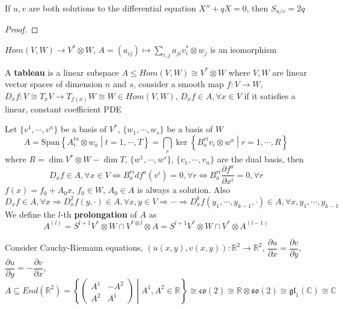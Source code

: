 \documentclass[../main.tex]{subfiles}
\begin{document}
\begin{lemma}
If $u,v$ are both solutions to the differential equation $X''+qX=0$, then $S_{u/v}=2q$
\end{lemma}

\begin{proof}

\end{proof}

\begin{lemma}
$Hom(V,W)\to V^*\otimes W$, $A=(a_{ij})\mapsto\sum_{i,j}a_{ji}v^*_i\otimes w_j$ is an isomorphism
\end{lemma}

\begin{definition}
A \textbf{tableau} is a linear subspace $A\leq Hom(V,W)\cong V^*\otimes W$ where $V,W$ are linear vector spaces of dimension $n$ and $s$, consider a smooth map $f:V\to W$, $D_xf:V\cong T_xV\to T_{f(x)}W\cong W\in Hom(V,W)$, $D_xf\in A,\forall x\in V$ if it satisfies a linear, constant coefficient PDE \par
Let $\{v^1,\cdots,v^n\}$ be a basis of $V^*$, $\{w_1,\cdots,w_s\}$ be a basis of $W$
\[A=\mathrm{Span}\left\{A^{ta}_i\otimes w_a\middle|t=1,\cdots,T\right\}=\bigcap_r\ker\left\{B^{ri}_av_i\otimes w^a\middle|r=1,\cdots,R\right\}\] where $R=\dim V^*\otimes W-\dim T$, $\{w^1,\cdots,w^s\}$, $\{v_1,\cdots,v_n\}$ are the dual basis, then
\[D_xf\in A,\forall x\in V\Leftrightarrow B^{ri}_adf^a(v^i)=0,\forall r\Leftrightarrow B^{ri}_a\dfrac{\partial f^a}{\partial x^i}=0,\forall r\]
$f(x)=f_0+A_0x$, $f_0\in W$, $A_0\in A$ is always a solution. Also
\[D_xf\in A,\forall x\Rightarrow D^2_xf(y,\cdot)\in A,\forall x,y\in V\Rightarrow\cdots\Rightarrow D^k_xf(y_1,\cdots,y_{k-1},\cdot)\in A,\forall x,y_1,\cdots,y_{k-1}\]
We define the $l$-th \textbf{prolongation} of $A$ as
\[A^{(l)}=S^{l+1}V^*\otimes W\cap V^{*\otimes l}\otimes A=S^{l+1}V^*\otimes W\cap V^*\otimes A^{(l-1)}\]
\end{definition}

\begin{example}
Consider Cauchy-Riemann equations, $(u(x,y),v(x,y)):\mathbb R^2\to\mathbb R^2$, $\dfrac{\partial u}{\partial x}=\dfrac{\partial v}{\partial y}$, $\dfrac{\partial u}{\partial y}=-\dfrac{\partial v}{\partial x}$, $A\subseteq End(\mathbb R^2)=\left\{\begin{pmatrix}
A^1&-A^2\\
A^2&A^1
\end{pmatrix}\middle|A^1,A^2\in\mathbb R\right\}\cong\mathfrak{co}(2)\cong\mathbb R\otimes\mathfrak{so}(2)\cong\mathfrak{gl}_1(\mathbb C)\cong\mathbb C$
\end{example}
\end{document}
